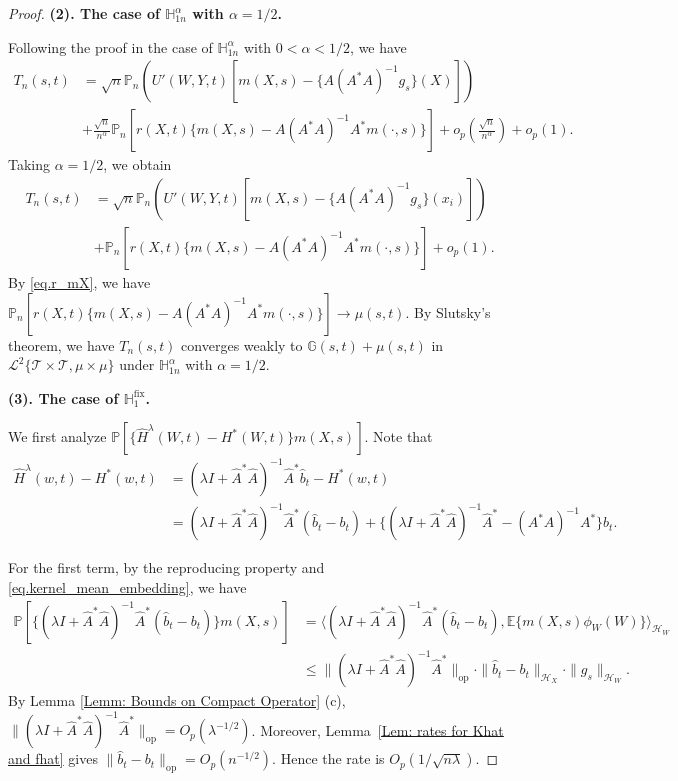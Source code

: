 \documentclass[
  12pt]{article}
\def\to{\rightarrow}
\def\mH{\mathbb{H}}
\def\mP{\mathbb{P}}
\def\cT{\mathcal{T}}
\begin{document}
\begin{proof}
\noindent\textbf{(2). The case of $\mH_{1n}^\alpha$ with $\alpha=1/2$.}

Following the proof in the case of $\mH_{1n}^\alpha$ with $0<\alpha<1/2$, we have
\begin{align*}	T_n(s,t)&=\sqrt{n}\mathbb{P}_n\left( U'(W,Y,t)\left[ m(X,s)-\{A(A^*A)^{-1}g_s\}(X) \right] \right)\\
    &+\frac{\sqrt{n}}{n^\alpha}\mP_n[r(X,t)\{m(X,s)-A(A^*A)^{-1}A^*m(\cdot,s)\}] +o_p\left( \frac{\sqrt{n}}{n^{\alpha}} \right)+o_p(1).
\end{align*}
Taking $\alpha=1/2$, we obtain
\begin{align*}	T_n(s,t)&=\sqrt{n}\mathbb{P}_n\left( U'(W,Y,t)\left[ m(X,s)-\{A(A^*A)^{-1}g_s\}(x_i) \right] \right)\\
    &+\mP_n[r(X,t)\{m(X,s)-A(A^*A)^{-1}A^*m(\cdot,s)\}]+o_p(1).
\end{align*}
By \eqref{eq.r_mX}, we have $\mP_n[r(X,t)\{m(X,s)-A(A^*A)^{-1}A^*m(\cdot,s)\}] \to \mu(s,t)$. By Slutsky's theorem, we have $T_n(s,t)$ converges weakly to $\mathbb{G}(s,t)+\mu(s,t)$ in $\mathcal{L}^{2}\{\cT \times \cT, \mu \times \mu\}$ under $\mathbb H^\alpha_{1n}$ with $\alpha=1/2$.

\noindent\textbf{(3). The case of $\mH_{1}^{\mathrm{fix}}$.}

We first analyze $\mathbb{P} \left[ \{\widehat{H}^{\lambda}(W,t)-H^*(W,t)\}m(X,s) \right]$. Note that
\begin{align*}
	\widehat{H}^{\lambda}(w,t)-H^*(w,t)&=(\lambda I+\widehat{A}^*\widehat{A})^{-1}\widehat{A}^*\widehat{b}_t-H^*(w,t)\\
	&=(\lambda I+\widehat{A}^*\widehat{A})^{-1}\widehat{A}^*( \widehat{b}_t-b_t) +\{(\lambda I+\widehat{A}^*\widehat{A})^{-1}\widehat{A}^*-(A^*A)^{-1}A^*\}b_{t}.
\end{align*}

For the first term, by the reproducing property and \eqref{eq.kernel_mean_embedding}, we have
\begin{align*}
	\mathbb{P} \left[ \{(\lambda I+\widehat{A}^*\widehat{A})^{-1}\widehat{A}^*( \widehat{b}_t-b_t ) \}m(X,s) \right] 
	&=\langle (\lambda I+\widehat{A}^*\widehat{A})^{-1}\widehat{A}^*( \widehat{b}_t-b_t ) ,\mathbb{E} \{ m(X,s) \phi_W(W) \} \rangle_{\mathcal{H}_W}\\
	&\le \| (\lambda I+\widehat{A}^*\widehat{A})^{-1}\widehat{A}^* \|_{\mathrm{op}}\cdot \| \widehat{b}_t-b_t \|_{\mathcal{H}_X}\cdot \| g_s\|_{\mathcal{H}_W}.
\end{align*}
By Lemma \ref{Lemm: Bounds on Compact Operator} (c), $\|(\lambda I + \widehat{A}^*\widehat{A} )^{-1}\widehat{A}^*\|_{\mathrm{op}}=O_p(\lambda^{-1/2})$. Moreover, Lemma~\ref{Lem: rates for Khat and fhat} gives $\|\widehat{b}_t-b_t\|_{\mathrm{op}}=O_p(n^{-1/2})$. Hence the rate is $O_p(1/\sqrt{n\lambda})$.


\end{proof}
\end{document}
